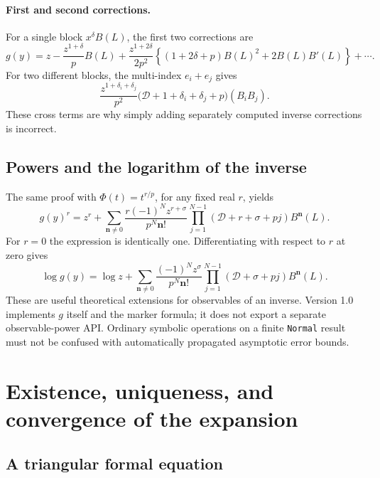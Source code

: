 \documentclass[11pt,a4paper]{article}
\numberwithin{equation}{section}
\theoremstyle{definition}
\theoremstyle{remark}
\newcommand{\D}{\mathcal D}
\begin{document}
\paragraph{First and second corrections.}
For a single block $x^\delta B(L)$, the first two corrections are
\begin{equation}
 g(y)=z-\frac{z^{1+\delta}}pB(L)
 +\frac{z^{1+2\delta}}{2p^2}
 \left\{(1+2\delta+p)B(L)^2+2B(L)B'(L)\right\}+\cdots.
 \label{eq:first-two-general}
\end{equation}
For two different blocks, the multi-index $e_i+e_j$ gives
\begin{equation}
 \frac{z^{1+\delta_i+\delta_j}}{p^2}
 \bigl(\D+1+\delta_i+\delta_j+p\bigr)(B_iB_j).
 \label{eq:cross-term}
\end{equation}
These cross terms are why simply adding separately computed inverse
corrections is incorrect.

\subsection{Powers and the logarithm of the inverse}

The same proof with $\Phi(t)=t^{r/p}$, for any fixed real $r$, yields
\begin{equation}
 g(y)^r=z^r+\sum_{\boldsymbol n\ne0}
 \frac{r(-1)^N z^{r+\sigma}}{p^N\boldsymbol n!}
 \prod_{j=1}^{N-1}(\D+r+\sigma+pj)B^{\boldsymbol n}(L).
 \label{eq:observable-power}
\end{equation}
For $r=0$ the expression is identically one. Differentiating with respect to
$r$ at zero gives
\begin{equation}
 \log g(y)=\log z+\sum_{\boldsymbol n\ne0}
 \frac{(-1)^N z^\sigma}{p^N\boldsymbol n!}
 \prod_{j=1}^{N-1}(\D+\sigma+pj)B^{\boldsymbol n}(L).
 \label{eq:log-inverse}
\end{equation}
These are useful theoretical extensions for observables of an inverse.
Version 1.0 implements $g$ itself and the marker formula; it does not export
a separate observable-power API. Ordinary symbolic operations on a finite
\texttt{Normal} result must not be confused with automatically propagated
asymptotic error bounds.

\section{Existence, uniqueness, and convergence of the expansion}
\label{sec:convergence}

\subsection{A triangular formal equation}
\end{document}
